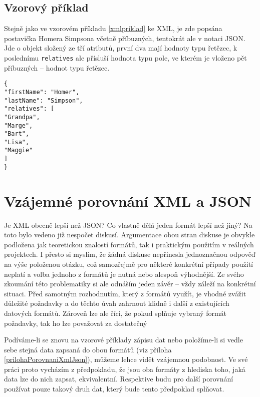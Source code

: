 \subsection{Vzorový příklad}
Stejně jako ve vzorovém příkladu \ref{xmlpriklad} ke XML, je zde popsána postavička Homera Simpsona včetně příbuzných, tentokrát ale v notaci JSON. Jde o objekt složený ze tří atributů, první dva mají hodnoty typu řetězec, k poslednímu \texttt{relatives} ale přísluší hodnota typu pole, ve kterém je vloženo pět příbuzných -- hodnot typu řetězec.

\texttt{\small\{\\
\hspace*{2mm}"firstName": "Homer",\\
\hspace*{2mm}"lastName": "Simpson",\\
\hspace*{2mm}"relatives": [\\
\hspace*{4mm}"Grandpa",\\
\hspace*{4mm}"Marge",\\
\hspace*{4mm}"Bart",\\
\hspace*{4mm}"Lisa",\\
\hspace*{4mm}"Maggie"\\
\hspace*{2mm}]\\
\} }

\section{Vzájemné porovnání XML a JSON}


Je XML obecně lepší než JSON? Co vlastně dělá jeden formát lepší než jiný? Na toto bylo vedeno již nespočet diskusí. Argumentace obou stran diskuse je obvykle podložena jak teoretickou znalostí formátů, tak i praktickým použitím v reálných projektech. I přesto si myslím, že žádná diskuse nepřinesla jednoznačnou odpověď na výše položenou otázku, což samozřejmě pro některé konkrétní případy použití neplatí a volba jednoho z formátů je nutná nebo alespoň výhodnější. Ze svého zkoumání této problematiky si ale odnáším jeden závěr -- vždy záleží na konkrétní situaci. Před samotným rozhodnutím, který z formátů využít, je vhodné zvážit důležité požadavky a do těchto úvah zahrnout klidně i další z existujících datových formátů. Zároveň lze ale říci, že pokud splňuje vybraný formát požadavky, tak ho lze považovat za dostatečný 

Podíváme-li se znovu na vzorové příklady zápisu dat nebo položíme-li si vedle sebe stejná data zapsaná do obou formátů (viz příloha \ref{prilohaPorovnaniXmlJson}), můžeme lehce vidět vzájemnou podobnost. Ve své práci proto vycházím z předpokladu, že jsou oba formáty z hlediska toho, jaká data lze do nich zapsat, ekvivalentní. Respektive budu pro další porovnání používat pouze takový druh dat, který bude tento předpoklad splňovat.